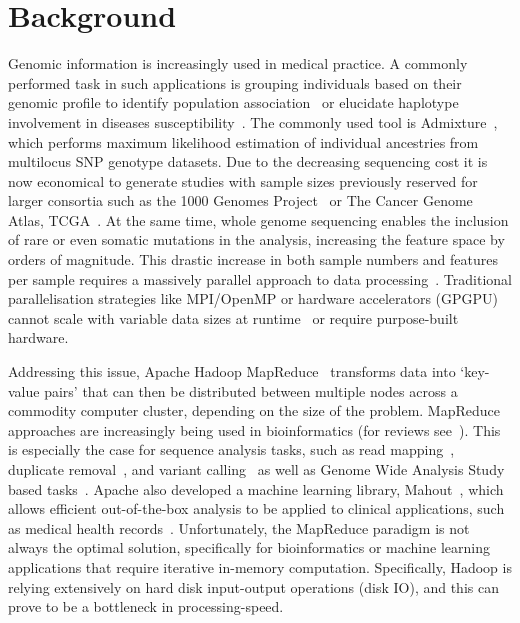 \documentclass{bmcart}
\begin{document}

\section*{Background}

Genomic information is increasingly used in medical practice.
A commonly performed task in such applications is grouping individuals based on their genomic profile to identify population association~\cite{Gao2007} or elucidate haplotype involvement in diseases susceptibility~\cite{Laitman2013}.  
The commonly used tool is {\sc Admixture}~\cite{Alexander2009}, which performs maximum likelihood estimation of individual ancestries from multilocus SNP genotype datasets.
Due to the decreasing sequencing cost it is now economical to generate studies with sample sizes previously reserved for larger consortia such as the 1000 Genomes Project~\cite{1KG2012} or The Cancer Genome Atlas, TCGA~\cite{TCGA2013}. 
At the same time, whole genome sequencing enables the inclusion of rare or even somatic mutations in the analysis, increasing the feature space by orders of magnitude. This drastic increase in both sample numbers and features per sample requires a massively parallel approach to data processing~\cite{Stein2010}. Traditional parallelisation strategies like MPI/OpenMP or hardware accelerators (GPGPU) cannot scale with variable data sizes at runtime~\cite{ReyesOrtiz2015121} or require purpose-built hardware.
 
Addressing this issue, {\sc Apache Hadoop MapReduce}~\cite{Borthakur2007} transforms data into `key-value pairs' that can then be distributed between multiple nodes across a commodity computer cluster, depending on the size of the problem. 
MapReduce approaches are increasingly being used in bioinformatics (for reviews see~\cite{Zou2013, Qiu2010,Taylor2010}). 
This is especially the case for sequence analysis tasks, such as read mapping~\cite{Schatz2009}, duplicate removal~\cite{Jourdren2012}, and variant calling~\cite{Langmead2009, McKenna2010} as well as Genome Wide Analysis Study based tasks~\cite{Huang2013, Guo2014}. 
Apache also developed a machine learning library, Mahout~\cite{Owen2011}, which allows efficient out-of-the-box analysis to be applied to clinical applications, such as medical health records~\cite{Ko2014}.
Unfortunately, the MapReduce paradigm is not always the optimal solution, specifically for bioinformatics or machine learning applications that require iterative in-memory computation. Specifically, Hadoop is relying extensively on hard disk input-output operations (disk IO), and this can prove to be a bottleneck in processing-speed.
\end{document}
